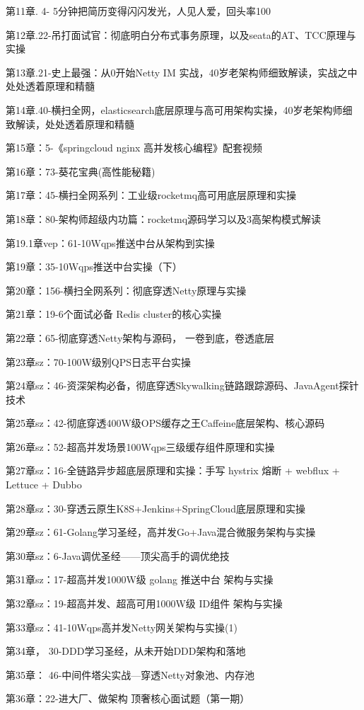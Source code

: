 \documentclass[10pt]{article}
\begin{document}
第11章. 4- 5分钟把简历变得闪闪发光，人见人爱，回头率100%

第12章.22-吊打面试官：彻底明白分布式事务原理，以及seata的AT、TCC原理与实操

第13章.21-史上最强：从0开始Netty IM 实战，40岁老架构师细致解读，实战之中处处透着原理和精髓

第14章.40-横扫全网，elasticsearch底层原理与高可用架构实操，40岁老架构师细致解读，处处透着原理和精髓

第15章：5-《springcloud nginx 高并发核心编程》配套视频

第16章：73-葵花宝典(高性能秘籍)

第17章：45-横扫全网系列：工业级rocketmq高可用底层原理和实操

第18章：80-架构师超级内功篇：rocketmq源码学习以及3高架构模式解读

第19.1章vep：61-10Wqps推送中台从架构到实操

第19章：35-10Wqps推送中台实操（下）

第20章：156-横扫全网系列：彻底穿透Netty原理与实操

第21章：19-6个面试必备 Redis cluster的核心实操

第22章：65-彻底穿透Netty架构与源码， 一卷到底，卷透底层

第23章sz：70-100W级别QPS日志平台实操

第24章sz：46-资深架构必备，彻底穿透Skywalking链路跟踪源码、JavaAgent探针技术

第25章sz：42-彻底穿透400W级OPS缓存之王Caffeine底层架构、核心源码

第26章sz：52-超高并发场景100Wqps三级缓存组件原理和实操

第27章sz：16-全链路异步超底层原理和实操：手写 hystrix 熔断 + webflux + Lettuce + Dubbo

第28章sz：30-穿透云原生K8S+Jenkins+SpringCloud底层原理和实操

第29章sz：61-Golang学习圣经，高并发Go+Java混合微服务架构与实操

第30章sz：6-Java调优圣经——顶尖高手的调优绝技

第31章sz：17-超高并发1000W级 golang 推送中台 架构与实操

第32章sz：19-超高并发、超高可用1000W级 ID组件 架构与实操

第33章sz：41-10Wqps高并发Netty网关架构与实操(1)

第34章， 30-DDD学习圣经，从未开始DDD架构和落地

第35章： 46-中间件塔尖实战—穿透Netty对象池、内存池

第36章：22-进大厂、做架构 顶奢核心面试题（第一期）
\end{document}
